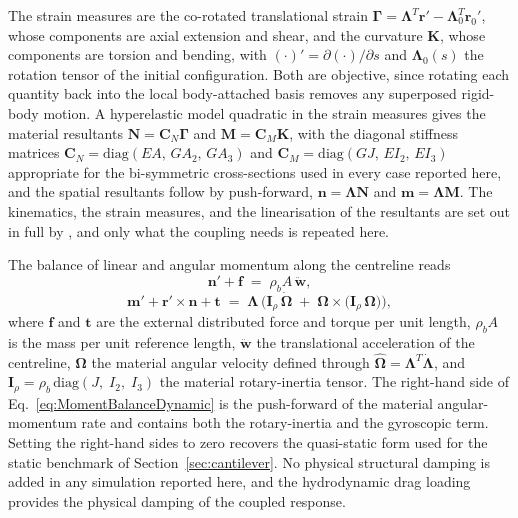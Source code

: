 \noindent
The strain measures are the co-rotated translational strain $\boldsymbol{\Gamma} = \boldsymbol{\Lambda}^T \mathbf{r}' - \boldsymbol{\Lambda}_0^T \mathbf{r}_0'$, whose components are axial extension and shear, and the curvature $\mathbf{K}$, whose components are torsion and bending, with $(\cdot)' = \partial(\cdot)/\partial s$ and $\boldsymbol{\Lambda}_0(s)$ the rotation tensor of the initial configuration. Both are objective, since rotating each quantity back into the local body-attached basis removes any superposed rigid-body motion. A hyperelastic model quadratic in the strain measures gives the material resultants $\mathbf{N} = \mathbf{C}_N \boldsymbol{\Gamma}$ and $\mathbf{M} = \mathbf{C}_M \mathbf{K}$, with the diagonal stiffness matrices $\mathbf{C}_N = \mathrm{diag}(EA,\,GA_2,\,GA_3)$ and $\mathbf{C}_M = \mathrm{diag}(GJ,\,EI_2,\,EI_3)$ appropriate for the bi-symmetric cross-sections used in every case reported here, and the spatial resultants follow by push-forward, $\mathbf{n} = \boldsymbol{\Lambda}\mathbf{N}$ and $\mathbf{m} = \boldsymbol{\Lambda}\mathbf{M}$. The kinematics, the strain measures, and the linearisation of the resultants are set out in full by \citet{bali_cell-centered_2022,bali_finite_2024}, and only what the coupling needs is repeated here.

\noindent
The balance of linear and angular momentum along the centreline reads
\begin{equation}
\mathbf{n}' + \mathbf{f} \;=\; \rho_{b}A\,\ddot{\mathbf{w}},
\label{eq:ForceBalanceDynamic}
\end{equation}
\begin{equation}
\mathbf{m}' + \mathbf{r}'\times\mathbf{n} + \mathbf{t} \;=\;
\boldsymbol{\Lambda}\,\bigl(\mathbf{I}_{\rho}\,\dot{\boldsymbol{\Omega}}
\;+\; \boldsymbol{\Omega}\times\bigl(\mathbf{I}_{\rho}\,\boldsymbol{\Omega}\bigr)\bigr),
\label{eq:MomentBalanceDynamic}
\end{equation}
where $\mathbf{f}$ and $\mathbf{t}$ are the external distributed force and torque per unit length, $\rho_{b}A$ is the mass per unit reference length, $\ddot{\mathbf{w}}$ the translational acceleration of the centreline, $\boldsymbol{\Omega}$ the material angular velocity defined through $\widehat{\boldsymbol{\Omega}} = \boldsymbol{\Lambda}^{T}\dot{\boldsymbol{\Lambda}}$, and $\mathbf{I}_{\rho} = \rho_{b}\,\mathrm{diag}\left(J,\;I_{2},\;I_{3}\right)$ the material rotary-inertia tensor. The right-hand side of Eq.~\eqref{eq:MomentBalanceDynamic} is the push-forward of the material angular-momentum rate and contains both the rotary-inertia and the gyroscopic term. Setting the right-hand sides to zero recovers the quasi-static form used for the static benchmark of Section~\ref{sec:cantilever}. No physical structural damping is added in any simulation reported here, and the hydrodynamic drag loading provides the physical damping of the coupled response.

